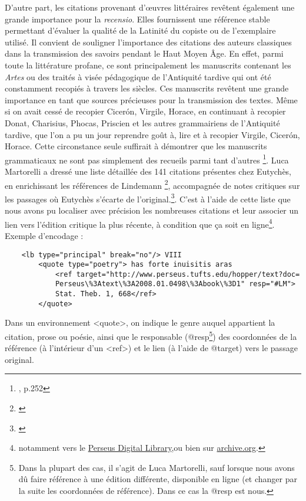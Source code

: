 \documentclass[a4paper, twoside, 12pt]{book}
\begin{document}
D'autre part, les citations provenant d'œuvres littéraires revêtent également une grande importance pour la \textit{recensio}. Elles fournissent une référence stable permettant d'évaluer la qualité de la  \og{} Latinité \fg{} du copiste ou de l'exemplaire utilisé. Il convient de souligner l'importance des citations des auteurs classiques dans la transmission des savoirs pendant le Haut Moyen Âge. En effet, parmi toute la littérature profane, ce sont principalement les manuscrits contenant les \textit{Artes} ou des traités à visée pédagogique de l'Antiquité tardive qui ont été constamment recopiés à travers les siècles. Ces manuscrits revêtent une grande importance en tant que sources précieuses pour la transmission des textes. Même si on avait cessé de recopier Cicerón, Virgile, Horace, en continuant à recopier Donat, Charisius, Phocas, Priscien et les autres grammairiens de l'Antiquité tardive, que l'on a pu un jour reprendre goût à, lire et à recopier Virgile, Cicerón, Horace. Cette circonstance seule suffirait à démontrer que les manuscrits grammaticaux ne sont pas simplement des recueils parmi tant d'autres \footnote{\cite{holtz1978typologie}, p.252}. Luca Martorelli a dressé une liste détaillée des 141 citations présentes chez Eutychès, en enrichissant les références de Lindemann \footnote{\cite{lindemann1833corpus}}, accompagnée de notes critiques sur les passages où Eutychès s'écarte de l'original.\footnote{\cite{martorelli2017citazioni}}. C'est à l'aide de cette liste que nous avons pu localiser avec précision les nombreuses citations et leur associer un lien vers l'édition critique la plus récente, à condition que ça soit en ligne\footnote{notamment vers le {\href{http://www.perseus.tufts.edu/hopper/}{Perseus Digital Library}},ou bien sur {\href{https://archive.org/}{archive.org}}.}. Exemple d'encodage : \\

\begin{verbatim}
    <lb type="principal" break="no"/> VIII 
        <quote type="poetry"> has forte inuisitis aras
            <ref target="http://www.perseus.tufts.edu/hopper/text?doc=
            Perseus\%3Atext\%3A2008.01.0498\%3Abook\%3D1" resp="#LM"> 
            Stat. Theb. 1, 668</ref>
        </quote>
\end{verbatim}


Dans un environnement <quote>, on indique le genre auquel appartient la citation, prose ou poésie, ainsi que le responsable (@resp\footnote{Dans la plupart des cas, il s'agit de Luca Martorelli, sauf lorsque nous avons dû faire référence à une édition différente, disponible en ligne (et changer par la suite les coordonnées de référence). Dans ce cas la @resp est nous.}) des coordonnées de la référence (à l'intérieur d'un <ref>) et le lien (à l'aide de @target) vers le passage original. \\
\end{document}
